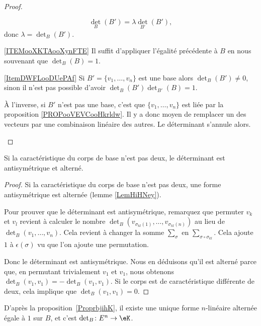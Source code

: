\begin{proof}
\begin{subproof}
		\begin{equation}
			\det_B(B')=\lambda\det_{B'}(B'),
		\end{equation}
		donc \( \lambda=\det_B(B')\).
		\item[\ref{ITEMooXKTAooXynFTE}]
		Il suffit d'appliquer l'égalité précédente à \( B\) en nous souvenant que \( \det_B(B)=1\).
		\item[\ref{ItemDWFLooDUePAf}]
		Si \( B'=\{ v_1,\ldots, v_n \}\) est une base alors \( \det_B(B')\neq 0\), sinon il n'est pas possible d'avoir \( \det_B(B')\det_{B'}(B)=1\).

		À l'inverse, si \( B'\) n'est pas une base, c'est que \( \{ v_1,\ldots, v_n \}\) est liée par la proposition \ref{PROPooVEVCooHkrldw}. Il y a donc moyen de remplacer un des vecteurs par une combinaison linéaire des autres. Le déterminant s'annule alors.
	\end{subproof}
\end{proof}

\begin{proposition}     \label{PROPooXNLDooGGkHpd}
	Si la caractéristique du corps de base n'est pas deux, le déterminant est antisymétrique et alterné.
\end{proposition}

\begin{proof}
	Si la caractéristique du corps de base n'est pas deux, une forme antisymétrique est alternée (lemme \ref{LemHiHNey}).

	Pour prouver que le déterminant est antisymétrique, remarquez que permuter \( v_k\) et \( v_l\) revient à calculer le nombre \( \det_B( v_{\sigma_{kl}(1)},\ldots, v_{\sigma_{kl}(n)} )\) au lieu de \( \det_B(v_1,\ldots, v_n)\). Cela revient à changer la somme \( \sum_{\sigma}\) en \( \sum_{\sigma\circ\sigma_{kl}}\). Cela ajoute \( 1\) à \( \epsilon(\sigma)\) vu que l'on ajoute une permutation.

	Donc le déterminant est antisymétrique. Nous en déduisons qu'il est alterné parce que, en permutant trivialement \( v_1\) et \( v_1\), nous obtenons \( \det_B(v_1,v_1)=-\det_B(v_1,v_1)\). Si le corps est de caractéristique différente de deux, cela implique que \( \det_B(v_1,v_1)=0\).
\end{proof}

D'après la proposition~\ref{ProprbjihK}, il existe une unique forme \( n\)-linéaire alternée égale à \( 1\) sur \( B\), et c'est \( \det_B\colon E^n\to \eK\).

